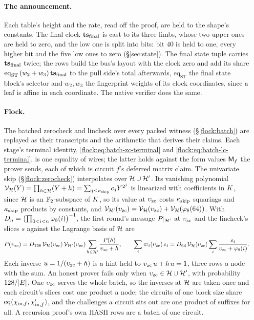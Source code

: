 \paragraph{The announcement.} Each table's height and the rate, read off the proof, are held to the shape's constants. The final clock $\mathbf{ts}_{\mathrm{final}}$ is cast to its three limbs, whose two upper ones are held to zero, and the low one is split into bits: bit $40$ is held to one, every higher bit and the five low ones to zero (\S\ref{sec:state}). The final state tuple carries $\mathbf{ts}_{\mathrm{final}}$ twice; the rows build the bus's layout with the clock zero and add its share $\mathrm{eq}_{\mathrm{ST}}\,(w_2+w_3)\,\mathbf{ts}_{\mathrm{final}}$ to the pull side's total afterwards, $\mathrm{eq}_{\mathrm{ST}}$ the final state block's selector and $w_2,w_3$ the fingerprint weights of its clock coordinates, since a leaf is affine in each coordinate. The native verifier does the same.

\paragraph{Flock.} The batched zerocheck and lincheck over every packed witness (\S\ref{flock:batch}) are replayed as their transcripts and the arithmetic that derives their claims. Each stage's terminal identity, \eqref{flock:eq:batch-zc-terminal} and \eqref{flock:eq:batch-lc-terminal}, is one equality of wires; the latter holds against the form values $\mathsf{M}_{f}$ the prover sends, each of which is circuit $f$'s deferred matrix claim. The univariate skip (\S\ref{flock:zerocheck}) interpolates over $\mathcal{H}\cup\mathcal{H}'$. Its vanishing polynomial $\mathcal{V}_{\mathcal{H}}(Y)=\prod_{h\in\mathcal{H}}(Y+h)=\sum_{j\le\kappa_{\mathrm{skip}}}c_jY^{2^j}$ is linearized with coefficients in $K$, since $\mathcal{H}$ is an $\mathbb{F}_2$-subspace of $K$, so its value at $\upsilon_{\mathrm{zc}}$ costs $\kappa_{\mathrm{skip}}$ squarings and $\kappa_{\mathrm{skip}}$ products by constants, and $\mathcal{V}_{\mathcal{H}'}(\upsilon_{\mathrm{zc}})=\mathcal{V}_{\mathcal{H}}(\upsilon_{\mathrm{zc}})+\mathcal{V}_{\mathcal{H}}(\varphi_{8}(64))$. With $D_n=\bigl(\prod_{0<i<n}\varphi_{8}(i)\bigr)^{-1}$, the first round's message $P|_{\mathcal{H}'}$ at $\upsilon_{\mathrm{zc}}$ and the lincheck's slices $s$ against the Lagrange basis of $\mathcal{H}$ are
\[
  P(\upsilon_{\mathrm{zc}})=D_{128}\,\mathcal{V}_{\mathcal{H}}(\upsilon_{\mathrm{zc}})\,\mathcal{V}_{\mathcal{H}'}(\upsilon_{\mathrm{zc}})\sum_{h\in\mathcal{H}'}\frac{P(h)}{\upsilon_{\mathrm{zc}}+h},\qquad
  \sum_i\varpi_i(\upsilon_{\mathrm{zc}})\,s_i=D_{64}\,\mathcal{V}_{\mathcal{H}}(\upsilon_{\mathrm{zc}})\sum_{i}\frac{s_i}{\upsilon_{\mathrm{zc}}+\varphi_{8}(i)}.
\]
Each inverse $u=1/(\upsilon_{\mathrm{zc}}+h)$ is a hint held to $\upsilon_{\mathrm{zc}}\,u+h\,u=1$, three rows a node with the sum. An honest prover fails only when $\upsilon_{\mathrm{zc}}\in\mathcal{H}\cup\mathcal{H}'$, with probability $128/|E|$. One $\upsilon_{\mathrm{zc}}$ serves the whole batch, so the inverses at $\mathcal{H}$ are taken once and each circuit's slices cost one product a node; the circuits of one block size share $\operatorname{eq}(\chi_{\mathrm{in},f},\chi'_{\mathrm{in},f})$, and the challenges a circuit sits out are one product of suffixes for all. A recursion proof's own \textsf{HASH} rows are a batch of one circuit.


